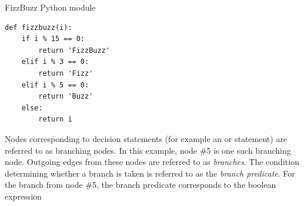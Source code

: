 \documentclass{icldt}
\numberwithin{equation}{section}       %
\begin{document}
\begin{listing}[H]
	\caption{FizzBuzz Python module}
	\begin{verbatim}
def fizzbuzz(i):
    if i % 15 == 0:
        return 'FizzBuzz'
    elif i % 3 == 0:
        return 'Fizz'
    elif i % 5 == 0:
        return 'Buzz'
    else:
        return i
	\end{verbatim}
	\label{lst:py-fizzbuzz}
\end{listing}

Nodes corresponding to decision statements (for example an  or  statement) are referred to as branching nodes. In this example, node \#5 is one such branching node. Outgoing edges from these nodes are referred to as \emph{branches}. The condition determining whether a branch is taken is referred to as the \emph{branch predicate}. For the branch from node \#5, the branch predicate corresponds to the boolean expression \pyth{i %

}
\end{document}
